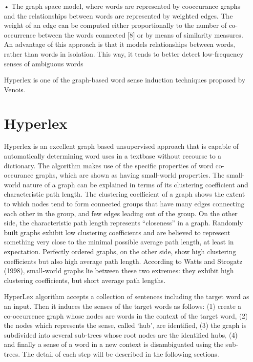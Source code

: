 \documentclass[article,dr=phil,type=drfinal,colorback,accentcolor=tud9c]{tudthesis}
\begin{document}
• The graph space model, where words are represented
by cooccurance graphs and the relationships between words are represented by  weighted edges. The weight of an edge can be
computed either proportionally to the number of co-
occurrence between the words connected [8] or by means
of similarity measures. An
advantage of this approach is that it models relationships
between words, rather than words in isolation. This
way, it tends to better detect low-frequency senses of
ambiguous words

Hyperlex is one of the graph-based word sense induction techniques proposed by Venois. 



\newpage
\section{Hyperlex}
Hyperlex is an excellent graph based unsupervised approach that is capable of automatically determining word uses in a textbase without recourse to a dictionary. The algorithm makes use of the specific properties of word co-occurance graphs, which are shown as having small-world properties. The small-world nature of a graph can be explained in terms of its clustering coefficient and characteristic path length. The clustering coefficient of a graph shows the extent to which nodes tend to form connected groups that have many edges connecting each other in the group, and few edges leading out of the group. On the other side, the characteristic path length represents “closeness” in a graph. Randomly built graphs exhibit low clustering coefficients and are believed to represent something very close to the minimal possible average path length, at least in expectation. Perfectly ordered graphs, on the other side, show high clustering coefficients but also high average path length. According to Watts and Strogatz (1998), small-world graphs lie between these two extremes: they exhibit high clustering coefficients, but short average path lengths.

HyperLex algorithm accepts a collection of sentences including the target word as an input. Then
it induces the senses of the target words as follows: (1) create a co-occurrence graph whose
nodes are words in the context of the target word, (2) the nodes which
represents the sense, called ‘hub’, are identified, (3) the graph is subdivided into several
sub-trees whose root nodes are the identified hubs, (4) and finally a sense of a word in a new context is disambiguated using the sub-trees. The detail of each step will be described in the
following sections.
\end{document}
